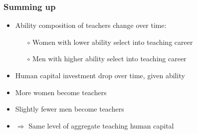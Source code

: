 \documentclass[11pt]{beamer}
\begin{document}
%

\begin{frame}
\frametitle{Summing up}

\begin{itemize}
    \item Ability composition of teachers change over time:
    \begin{itemize}
				\item[$\circ$] Women with lower ability select into teaching career %
                \item[$\circ$] Men with higher ability select into teaching career %
    \end{itemize}
    \item Human capital investment drop over time, given ability %
    \item More women become teachers
    \item Slightly fewer men become teachers
    \item $\Rightarrow$ Same level of aggregate teaching human capital 
\end{itemize}
\end{frame}
\end{document}
